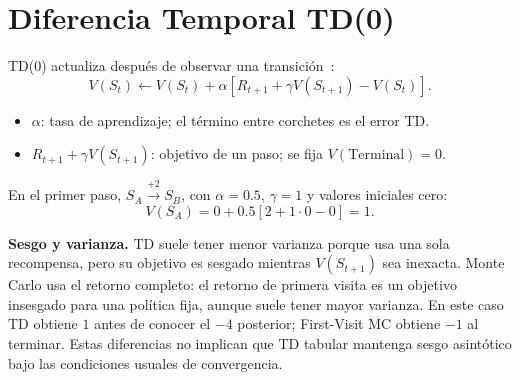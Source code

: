 \section{Diferencia Temporal TD(0)}
TD(0) actualiza después de observar una transición~\cite[secc.~6.1]{sutton}:
\begin{equation}\label{eq:td-zero}
    V(S_t)\leftarrow V(S_t)+\alpha
    [R_{t+1}+\gamma V(S_{t+1})-V(S_t)].
\end{equation}
\begin{itemize}
    \item $\alpha$: tasa de aprendizaje; el término entre corchetes es el error TD.
    \item $R_{t+1}+\gamma V(S_{t+1})$: objetivo de un paso; se fija $V(\text{Terminal})=0$.
\end{itemize}
En el primer paso, $S_A\xrightarrow{+2}S_B$, con $\alpha=0.5$, $\gamma=1$ y valores iniciales cero:
\begin{equation}\label{eq:td-example}
    V(S_A)=0+0.5[2+1\cdot0-0]=1.
\end{equation}

\textbf{Sesgo y varianza.} TD suele tener menor varianza porque usa una sola recompensa, pero su objetivo es sesgado mientras $V(S_{t+1})$ sea inexacta. Monte Carlo usa el retorno completo: el retorno de primera visita es un objetivo insesgado para una política fija, aunque suele tener mayor varianza. En este caso TD obtiene $1$ antes de conocer el $-4$ posterior; First-Visit MC obtiene $-1$ al terminar. Estas diferencias no implican que TD tabular mantenga sesgo asintótico bajo las condiciones usuales de convergencia.
